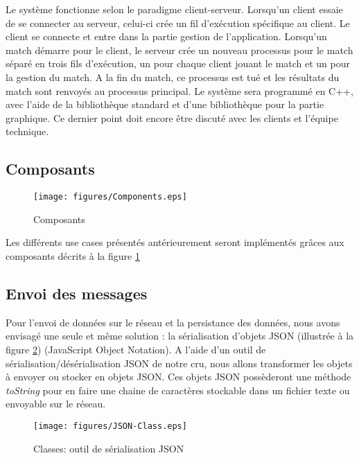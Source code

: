 Le système fonctionne selon le paradigme \gls{client}-\gls{serveur}.
Lorsqu'un client essaie de se connecter au serveur, celui-ci crée un fil d'exécution 
spécifique au client. Le client se connecte et entre dans la partie gestion de 
l'application. Lorsqu'un match démarre pour le client, le serveur crée un 
nouveau processus pour le match séparé en trois fils d'exécution, un pour 
chaque client jouant le match et un pour la gestion du match. A la fin du 
match, ce processus est tué et les résultats du match sont renvoyés au 
processus principal.
Le système sera programmé en C++, avec l'aide de la bibliothèque standard et 
d'une bibliothèque pour la partie graphique. Ce dernier point doit encore 
être discuté avec les clients et l'équipe technique.

\subsection{Composants}
\begin{figure}[h!]
  \centering
  \texttt{[image: figures/Components.eps]}
  \caption{\label{fig:Components} Composants}
\end{figure}
Les différents use cases présentés antérieurement seront implémentés grâces aux composants décrits à la figure \ref{fig:Components}

\subsection{Envoi des messages}
Pour l'envoi de données sur le réseau et la persistance des données, nous 
avons envisagé une seule et même solution : la sérialisation d'objets JSON (illustrée à la figure \ref{fig:Class:JSON})
(JavaScript Object Notation). A l'aide d'un outil de sérialisation/désérialisation JSON de notre 
cru, nous allons transformer les objets à envoyer ou stocker en objets JSON. 
Ces objets JSON possèderont une méthode \textit{toString} pour en faire une 
chaine de caractères stockable dans un fichier texte ou envoyable sur le 
réseau.

\begin{figure}[h!]
  \centering
  \texttt{[image: figures/JSON-Class.eps]}
  \caption{\label{fig:Class:JSON} Classes: outil de sérialisation JSON}
\end{figure}

